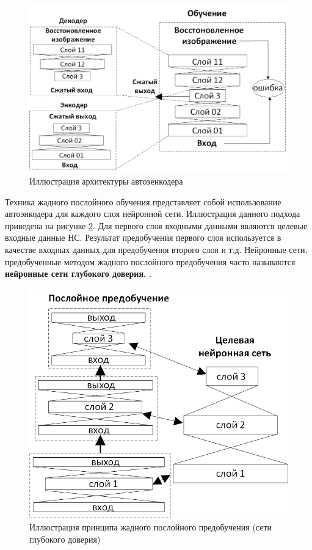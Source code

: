 \documentclass[12pt]{article}
\begin{document}
\begin{sloppypar}
\begin{figure}[!h]
	\begin{center}
		\includegraphics[width=0.86\linewidth]{./figuresch1/autoencoder_v2.png}
		\caption{Иллюстрация архитектуры автоэенкодера}		
		\label{ch1:fig:autoencoder}
	\end{center}
\end{figure}

Техника жадного послойного обучения представляет собой использование автоэнкодера для каждого слоя нейронной сети. 
Иллюстрация данного подхода приведена на рисунке \ref{ch1:fig:deep_belife_nn}.
Для первого слоя входными данными являются целевые входные данные НС. Результат предобучения первого слоя используется в качестве входных данных для предобучения второго слоя и т.д. Нейронные сети, предобученные методом жадного послойного предобучения часто называются \textbf{нейронные сети глубокого доверия.} \cite{goodfellow2016deep}. 

\begin{figure}[!h]
	\begin{center}
		\includegraphics[width=0.76\linewidth]{./figuresch1/deep_belife_NN.png}
		\caption{Иллюстрация принципа жадного послойного предобучения (сети глубокого доверия)}		
		\label{ch1:fig:deep_belife_nn}
	\end{center}
\end{figure}


\end{sloppypar}
\end{document}
